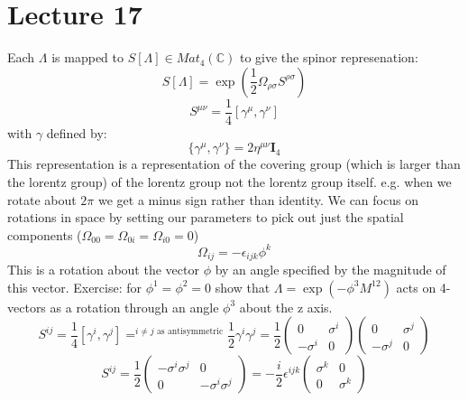 \documentclass[12pt, a4paper, twoside, titlepage]{article}
\begin{document}
                \section{Lecture 17}
                Each $\Lambda$ is mapped to $S[\Lambda] \in Mat_4 (\mathbb{C})$ to give the spinor represenation:
                \begin{equation}
                        S[\Lambda] = \exp(\frac{1}{2} \Omega_{\rho \sigma} S^{\rho \sigma})
                \end{equation}
                \begin{equation}
                        S^{\mu \nu} = \frac{1}{4} [\gamma^{\mu}, \gamma^{\nu}]
                \end{equation}
                with $\gamma$ defined by:
                \begin{equation}
                        \{ \gamma^{\mu}, \gamma^{\nu} \} = 2 \eta^{\mu \nu} \bm I_4
                \end{equation}
                This representation is a representation of the covering group (which is larger than the lorentz group) of the lorentz group not the lorentz group itself. e.g. when we rotate about $2\pi$ we get a minus sign rather than identity. We can focus on rotations in space by setting our parameters to pick out just the spatial components ($\Omega_{00} = \Omega_{0i} = \Omega_{i0} = 0$)
                $$
                \Omega_{ij} = - \epsilon_{ijk} \phi^k
                $$
                This is a rotation about the vector $\phi$ by an angle specified by the magnitude of this vector. Exercise: for $\phi^1= \phi^2=0$ show that $\Lambda = \exp (- \phi^3 M^{12})$ acts on 4-vectors as a rotation through an angle $\phi^3$ about the z axis.
                $$
                                S^{ij} = \frac{1}{4} [ \gamma^{i} , \gamma^{j}] =^{i\neq j \text{ as antisymmetric}} \frac{1}{2} \gamma^i \gamma^j =\frac{1}{2} \begin{pmatrix} 0 & \sigma^i \\ - \sigma^i & 0 \end{pmatrix} \begin{pmatrix} 0 & \sigma^j \\ - \sigma^j & 0 \end{pmatrix}
                $$
                $$
                                S^{ij} = \frac{1}{2} \begin{pmatrix} - \sigma^i\sigma^j & 0 \\0& - \sigma^i\sigma^j  \end{pmatrix}  = -\frac{i}{2} \epsilon^{ijk} \begin{pmatrix} \sigma^k & 0 \\ 0 & \sigma^k \end{pmatrix}                  $$
\end{document}
